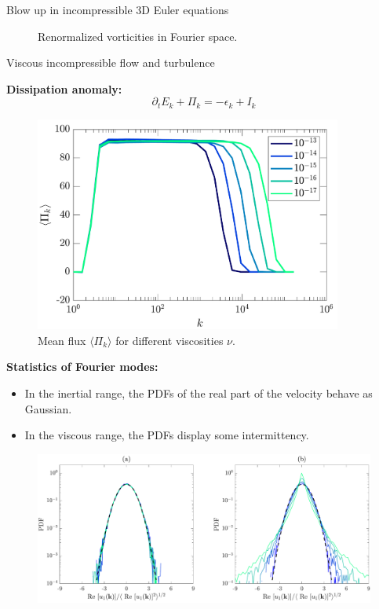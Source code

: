 \documentclass{beamer} %
\begin{document}
\begin{frame}{Blow up in incompressible 3D Euler equations}
\begin{minipage}{0.49\textwidth}
\begin{figure}
      \caption{Renormalized vorticities in Fourier space. \cite{campolina}}
    \end{figure}
  \end{minipage}
  \vspace{-0.5cm}
\end{frame}
\begin{frame}{Viscous incompressible flow and turbulence}
  \begin{minipage}{0.39\textwidth}
    \textbf{Dissipation anomaly:}
    $$
      \partial_t E_k + \Pi_k = -\epsilon_k + I_k
    $$
    \begin{figure}
      \centering
      \includegraphics[width=0.9\textwidth]{images/viscous-1.png}
      \caption{Mean flux $\langle \Pi_k\rangle$ for different viscosities $\nu$. \cite{campolina}}
    \end{figure}
  \end{minipage}\hfill
  \begin{minipage}{0.59\textwidth}
    \textbf{Statistics of Fourier modes:}
    \begin{itemize}
      \item In the inertial range, the PDFs of the real part of the velocity behave as Gaussian.
      \item In the viscous range, the PDFs display some intermittency.
    \end{itemize}
    \begin{figure}
      \centering
      \includegraphics[width=\textwidth]{images/viscous-2.png}

\end{figure}
\end{minipage}
\end{frame}
\end{document}
